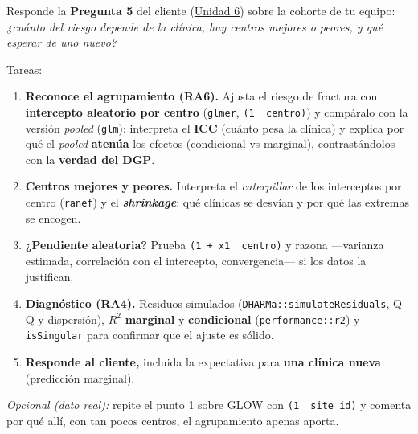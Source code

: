 \documentclass[
  letterpaper,
  DIV=11,
  numbers=noendperiod]{scrartcl}
\providecommand{\tightlist}{%
  \setlength{\itemsep}{0pt}\setlength{\parskip}{0pt}}\usepackage{longtable,booktabs,array}
\begin{document}
\begin{tcolorbox}[enhanced jigsaw, coltitle=black, rightrule=.15mm, arc=.35mm, leftrule=.75mm, colback=white, colbacktitle=quarto-callout-important-color!10!white, left=2mm, breakable, toptitle=1mm, toprule=.15mm, bottomtitle=1mm, titlerule=0mm, title=\textcolor{quarto-callout-important-color}{\faExclamation}\hspace{0.5em}{Tarea del estudiante (1.4) --- resuelve la Pregunta 5 del caso}, bottomrule=.15mm, opacityback=0, opacitybacktitle=0.6, colframe=quarto-callout-important-color-frame]

Responde la \textbf{Pregunta 5} del cliente
(\protect\hyperlink{sec-u16}{Unidad 6}) sobre la cohorte de tu equipo:
\emph{¿cuánto del riesgo depende de la clínica, hay centros mejores o
peores, y qué esperar de uno nuevo?}

Tareas:

\begin{enumerate}
\def\labelenumi{\arabic{enumi}.}
\tightlist
\item
  \textbf{Reconoce el agrupamiento (RA6).} Ajusta el riesgo de fractura
  con \textbf{intercepto aleatorio por centro} (\texttt{glmer},
  \texttt{(1\ \textbar{}\ centro)}) y compáralo con la versión
  \emph{pooled} (\texttt{glm}): interpreta el \textbf{ICC} (cuánto pesa
  la clínica) y explica por qué el \emph{pooled} \textbf{atenúa} los
  efectos (condicional vs marginal), contrastándolos con la
  \textbf{verdad del DGP}.
\item
  \textbf{Centros mejores y peores.} Interpreta el \emph{caterpillar} de
  los interceptos por centro (\texttt{ranef}) y el
  \textbf{\emph{shrinkage}}: qué clínicas se desvían y por qué las
  extremas se encogen.
\item
  \textbf{¿Pendiente aleatoria?} Prueba
  \texttt{(1\ +\ x1\ \textbar{}\ centro)} y razona ---varianza estimada,
  correlación con el intercepto, convergencia--- si los datos la
  justifican.
\item
  \textbf{Diagnóstico (RA4).} Residuos simulados
  (\texttt{DHARMa::simulateResiduals}, Q--Q y dispersión), \(R^2\)
  \textbf{marginal} y \textbf{condicional} (\texttt{performance::r2}) y
  \texttt{isSingular} para confirmar que el ajuste es sólido.
\item
  \textbf{Responde al cliente,} incluida la expectativa para \textbf{una
  clínica nueva} (predicción marginal).
\end{enumerate}

\emph{Opcional (dato real):} repite el punto 1 sobre GLOW con
\texttt{(1\ \textbar{}\ site\_id)} y comenta por qué allí, con tan pocos
centros, el agrupamiento apenas aporta.

\end{tcolorbox}
\end{document}
